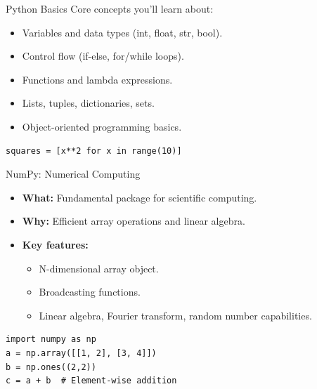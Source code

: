 \documentclass{beamer}
\begin{document}
	\begin{frame}[fragile]{Python Basics}
		Core concepts you'll learn about:
		\begin{itemize}
			\item Variables and data types (int, float, str, bool).
			\item Control flow (if-else, for/while loops).
			\item Functions and lambda expressions.
			\item Lists, tuples, dictionaries, sets.
			\item Object-oriented programming basics.
		\end{itemize}
		
		\begin{example}
			\begin{lstlisting}
squares = [x**2 for x in range(10)]
			\end{lstlisting}
		\end{example}
	\end{frame}
	
	\begin{frame}[fragile]{NumPy: Numerical Computing}
		\begin{itemize}
			\item \textbf{What:} Fundamental package for scientific computing.
			\item \textbf{Why:} Efficient array operations and linear algebra.
			\item \textbf{Key features:}
			\begin{itemize}
				\item N-dimensional array object.
				\item Broadcasting functions.
				\item Linear algebra, Fourier transform, random number capabilities.
			\end{itemize}
		\end{itemize}
		
		\begin{example}
			\begin{lstlisting}
import numpy as np
a = np.array([[1, 2], [3, 4]])
b = np.ones((2,2))
c = a + b  # Element-wise addition
			\end{lstlisting}
		\end{example}
	\end{frame}
	
\end{document}
